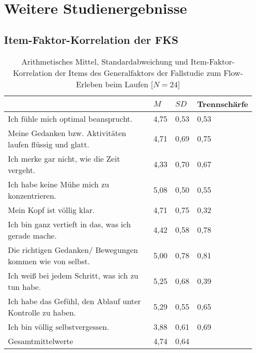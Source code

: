 \chapter{Weitere Studienergebnisse}

\section{Item-Faktor-Korrelation der FKS}

\begin{table}[ht]
\centering
	\caption[Item-Faktor-Korrelation der Items des Generalfaktors (Fallstudie: Laufen)]{Arithmetisches Mittel, Standardabweichung und Item-Faktor-Korrelation der Items des Generalfaktors der Fallstudie zum Flow-Erleben beim Laufen [$N = 24$]}
	\label{tab:generalfaktor_fallstudie_laufen}
	\begin{tabularx}{\textwidth}{p{} p{} p{} p{}}
\toprule
& $M$ & $SD$ & Trennschärfe \\
\midrule
Ich fühle mich optimal beansprucht. & 4,75 & 0,53 & 0,53 \\
Meine Gedanken bzw. Aktivitäten laufen flüssig und glatt. & 4,71 & 0,69 & 0,75 \\
Ich merke gar nicht, wie die Zeit vergeht. & 4,33 & 0,70 & 0,67 \\
Ich habe keine Mühe mich zu konzentrieren. & 5,08 & 0,50 & 0,55 \\
Mein Kopf ist völlig klar. & 4,71 & 0,75 & 0,32 \\
Ich bin ganz vertieft in das, was ich gerade mache. & 4,42 & 0,58 & 0,78 \\
Die richtigen Gedanken/ Bewegungen kommen wie von selbst. & 5,00 & 0,78 & 0,81 \\
Ich weiß bei jedem Schritt, was ich zu tun habe. & 5,25 & 0,68 & 0,39 \\
Ich habe das Gefühl, den Ablauf unter Kontrolle zu haben. & 5,29 & 0,55 & 0,65 \\
Ich bin völlig selbstvergessen. & 3,88 & 0,61 & 0,69 \\
Gesamtmittelwerte & 4,74 & 0,64 & \\
\bottomrule
\end{tabularx}
\end{table}

\pagebreak

